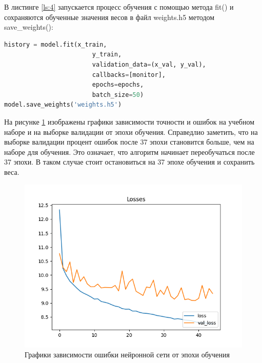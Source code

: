 В листинге \ref{ls:4} запускается процесс обучения с помощью метода fit() и сохраняются обученные значения весов в файл weights.h5 методом save\_weights():
\begin{lstlisting}[caption={Использовние метода fit() и save\_weights()},language=python,label={ls:4}] 
history = model.fit(x_train,
                        y_train,
                        validation_data=(x_val, y_val),
                        callbacks=[monitor],
                        epochs=epochs,
                        batch_size=50)
model.save_weights('weights.h5')
\end{lstlisting}

На рисунке \ref{fig:5} изображены графики зависимости точности и ошибок на учебном наборе и на выборке валидации от эпохи обучения. Справедлио заметить, что на выборке валидации процент ошибок после 37 эпохи становится больше, чем на наборе для обучения. Это означает, что алгоритм начинает переобучаться после 37 эпохи. В таком случае стоит остановиться на 37 эпохе обучения и сохранить веса.
\begin{figure}[!h] 
  \center
  \includegraphics [scale=0.9] {img/losses.png}
  \caption{Графики зависимости ошибки нейронной сети от эпохи обучения} 
  \label{fig:5}  
\end{figure}

